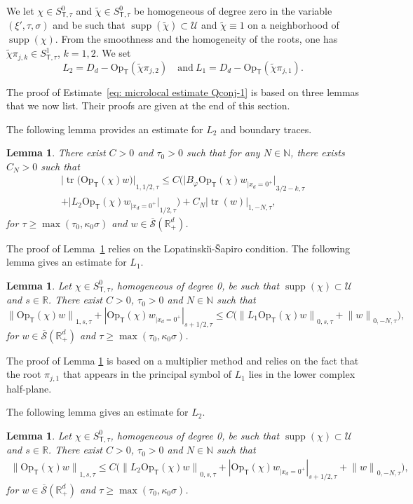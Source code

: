 \documentclass[JEP,XML,SOM,Unicode,published]{cedram}
\theoremstyle{plain}
\newtheorem{lemma}[theorem]{Lemma}
\theoremstyle{definition}
\def\R{\mathbb{R}}
\def\N{\mathbb{N}}
\newcommand{\LS}{Lopatinski\u{\i}-\v{S}apiro\xspace}
\newcommand{\nhd}{neighborhood\xspace}
\let\k\kappa
\newcommand{\tchi}{\tilde{\chi}}
\newcommand{\U}{\mathscr U}
\newcommand{\br}{\ensuremath{_{|x_d=0^+}}}
\newcommand{\Opt}{\ensuremath{\mathrm{Op}_{\scriptscriptstyle{\mathsf{T}}}}}
\newcommand{\Normsc}[2]{{\| #1 \|}_{#2, \tau}}
\newcommand{\normsc}[2]{{| #1 |}_{#2, \tau}}
\newcommand{\bignormsc}[2]{{\big| #1 \big|}_{#2, \tau}}
\newcommand{\Ssct}{S_{{\scriptscriptstyle{\mathsf T}},\tau}}
\newcommand{\Sbarp}{\ensuremath{\overline{\mathscr{S}}(\Rdp)}}
\newcommand{\Rdp}{\R^d_+}
\DeclareMathOperator{\supp}{supp}
\DeclareMathOperator{\trace}{tr}
\begin{document}
We let $\chi\in \Ssct^0$ and
$\tchi\in \Ssct^0$ be homogeneous of degree zero
in the variable $(\xi',\tau,\sigma)$ and be such that
$\supp(\tchi)\subset\U$ and
$\tchi\equiv 1$ on a \nhd of $\supp(\chi)$. From the smoothness and
the homogeneity of the roots, one has
$\tchi\pi_{j,k}\in \Ssct^1$, $k=1,2$. We
set
\begin{equation*}
L_2=D_d-\Opt(\tchi\pi_{j,2})
\quad \text{and} \
L_1=D_d-\Opt(\tchi\pi_{j,1}).
\end{equation*}

The proof of Estimate~\eqref{eq: microlocal estimate Qconj-1} is based on three lemmas that we now
list. Their proofs are given at the end of this section.

The following lemma provides an estimate for $L_2$ and boundary traces.

\begin{lemma}\label{lr1}
There exist $C>0$ and $\tau_0>0$ such that for any $N\in\N$, there exists $C_N>0$ such that
\begin{multline*}
\bignormsc{\trace \big(\Opt(\chi)w\big)}{1,1/2}
\leq C\big(\bignormsc{B_{\varphi}\Opt(\chi)w\br}{3/2-k}\\
+\bignormsc{L_2 \Opt(\chi)w\br}{1/2}
\big)
+C_N \normsc{\trace(w)}{1,-N},
\end{multline*}
for $\tau\geq \max(\tau_0, \k_0\sigma)$ and $w\in \Sbarp$.
\end{lemma}
The proof of Lemma~\ref{lr1} relies on the \LS condition.
The
following lemma gives an estimate for $L_1$.

\begin{lemma}\label{sl2}
Let $\chi\in \Ssct^0$, homogeneous of degree 0, be such that
$\supp(\chi)\subset\U$ and $s \in \R$. There exist $C>0$, $\tau_0>0$ and
$N\in\N$ such that
\[
\Normsc{\Opt(\chi)w}{1,s}
+\normsc{\Opt(\chi)w\br}{s+1/2}
\leq C \big(\Normsc{L_1 \Opt(\chi)w}{0,s}
+\Normsc{w}{0,-N} \big),
\]
for $w\in\Sbarp$ and $\tau\geq \max(\tau_0, \k_0\sigma)$.
\end{lemma}
The proof of Lemma \ref{sl2} is based on a multiplier method and
relies on the fact that the root $\pi_{j,1}$ that appears in the
principal symbol of $L_1$ lies in the lower complex half-plane.

The
following lemma gives an estimate for $L_2$.

\begin{lemma}\label{lemma: estimate L2}
Let $\chi\in \Ssct^0$, homogeneous of degree 0, be such that
$\supp(\chi)\subset\U$ and $s \in \R$. There exist $C>0$, $\tau_0>0$ and
$N\in\N$ such that
\begin{align*}
\Normsc{\Opt(\chi)w}{1,s}
\leq C \big(\Normsc{L_2 \Opt(\chi)w}{0,s}
+ \normsc{\Opt(\chi)w\br}{s+1/2} +\Normsc{w}{0,-N} \big),
\end{align*}
for $w\in\Sbarp$ and $\tau\geq \max(\tau_0, \k_0\sigma)$.
\end{lemma}
\end{document}
